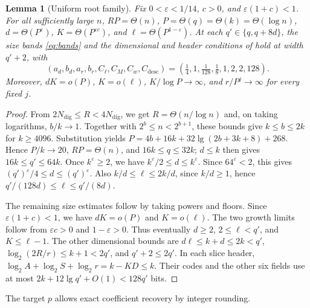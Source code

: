 \documentclass[11pt]{article}
\newtheorem{lemma}[theorem]{Lemma}
\theoremstyle{definition}
\renewcommand{\label}[1]{}%
\newcommand{\eps}{\varepsilon}
\begin{document}
\begin{lemma}[Uniform root family]\label{lem:root-family}
Fix $0<\eps<1/14$, $c>0$, and $\eps(1+c)<1$.
For all sufficiently large $n$, $RP=\Theta(n)$,
$P=\Theta(q)=\Theta(k)=\Theta(\log n)$,
$d=\Theta(P^\eps)$, $K=\Theta(P^{\eps c})$, and $\ell=\Theta(P^{1-\eps})$.
At each $q'\in\{q,q+8d\}$, the size bands \eqref{eq:bands} and the
dimensional and header conditions of  hold at width
$q'+2$, with
\[
 (a_d,b_d,a_r,b_r,C_\ell,C_M,C_w,C_{\mathrm{desc}})
 =(\tfrac14,1,\tfrac1{128},\tfrac18,1,2,2,128).
\]
Moreover, $dK=o(P)$, $K=o(\ell)$, $K/\log P\to\infty$, and
$r/P^j\to\infty$ for every fixed $j$.
\end{lemma}
\begin{proof}
From $2N_{\mathrm{dig}}\le R<4N_{\mathrm{dig}}$, we get
$R=\Theta(n/\log n)$ and, on taking logarithms, $b/k\to1$.
Together with $2^b\le n<2^{b+1}$, these bounds give $k\le b\le2k$ for $k\ge4096$.
Substitution yields $P=4b+16k+32\lg(2b+3k+8)+268$.
Hence $P/k\to20$, $RP=\Theta(n)$, and $16k\le q\le32k$;
$d\le k$ then gives $16k\le q'\le64k$.
Once $k^\eps\ge2$, we have $k^\eps/2\le d\le k^\eps$.
Since $64^\eps<2$, this gives $(q')^\eps/4\le d\le(q')^\eps$.
Also $k/d\le\ell\le2k/d$, since $k/d\ge1$, hence
$q'/(128d)\le\ell\le q'/(8d)$.

The remaining size estimates follow by taking powers and floors.
Since $\eps(1+c)<1$, we have $dK=o(P)$ and $K=o(\ell)$.
The two growth limits follow from $\eps c>0$ and $1-\eps>0$.
Thus eventually $d\ge2$, $2\le\ell<q'$, and $K\le\ell-1$.
The other dimensional bounds are
$d\ell\le k+d\le2k<q'$, $\log_2(2R/r)\le k+1<2q'$, and $q'+2\le2q'$.
In each slice header, $\log_2A+\log_2S+\log_2r=k-KD\le k$.
Their codes and the other six fields use at most
$2k+12\lg q'+O(1)<128q'$ bits.
\end{proof}

The target $p$ allows exact coefficient recovery by integer rounding.
\end{document}
